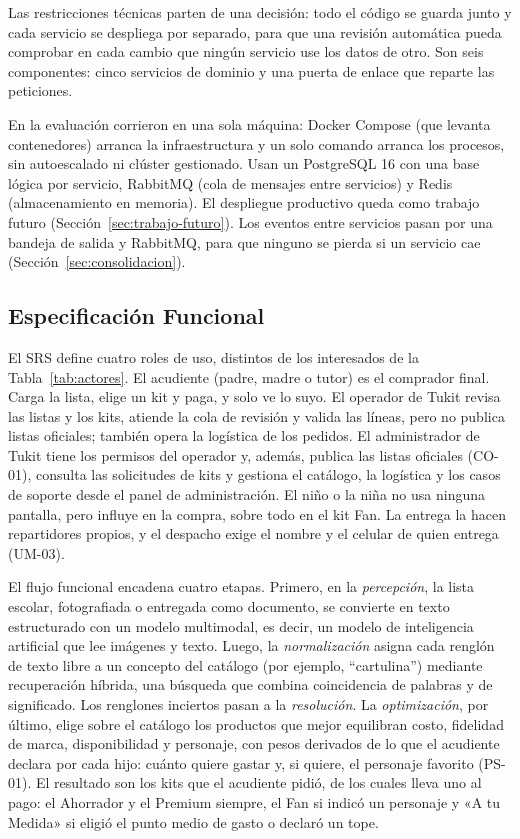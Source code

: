 Las restricciones técnicas parten de una decisión: todo el código se guarda junto y cada servicio se despliega por separado, para que una revisión automática pueda comprobar en cada cambio que ningún servicio use los datos de otro. Son seis componentes: cinco servicios de dominio y una puerta de enlace que reparte las peticiones.

En la evaluación corrieron en una sola máquina: Docker Compose (que levanta contenedores) arranca la infraestructura y un solo comando arranca los procesos, sin autoescalado ni clúster gestionado. Usan un PostgreSQL 16 con una base lógica por servicio, RabbitMQ (cola de mensajes entre servicios) y Redis (almacenamiento en memoria). El despliegue productivo queda como trabajo futuro (Sección~\ref{sec:trabajo-futuro}). Los eventos entre servicios pasan por una bandeja de salida y RabbitMQ, para que ninguno se pierda si un servicio cae (Sección~\ref{sec:consolidacion}).

\subsection{Especificación Funcional}
\label{sec:especificacion-funcional}

El SRS define cuatro roles de uso, distintos de los interesados de la Tabla~\ref{tab:actores}. El acudiente (padre, madre o tutor) es el comprador final.
Carga la lista, elige un kit y paga, y solo ve lo suyo. El operador de Tukit revisa las listas y los kits, atiende la
cola de revisión y valida las líneas, pero no publica listas oficiales; también opera la
logística de los pedidos. El administrador de
Tukit tiene los permisos del operador y, además, publica las listas oficiales (CO-01), consulta
las solicitudes de kits y gestiona el catálogo, la logística y los casos de soporte desde el
panel de administración. El niño o la niña no usa ninguna pantalla, pero influye en la compra,
sobre todo en el kit Fan. La entrega la hacen repartidores propios, y el despacho exige el nombre y
el celular de quien entrega (UM-03).

El flujo funcional encadena cuatro etapas. Primero, en la \emph{percepción}, la lista escolar, fotografiada o entregada como
documento, se convierte en texto estructurado con un modelo multimodal, es decir, un modelo de inteligencia artificial que lee imágenes y texto. Luego, la \emph{normalización} asigna cada renglón de
texto libre a un concepto del catálogo (por ejemplo, ``cartulina'') mediante recuperación híbrida, una búsqueda que combina coincidencia de palabras y de significado. Los renglones inciertos pasan a la \emph{resolución}. La
\emph{optimización}, por último, elige sobre el catálogo los productos que mejor equilibran
costo, fidelidad de marca, disponibilidad y personaje, con pesos derivados de lo que el
acudiente declara por cada hijo: cuánto quiere gastar y, si quiere, el personaje favorito
(PS-01). El resultado son los kits que el acudiente pidió, de los cuales lleva uno al pago:
el Ahorrador y el Premium siempre, el Fan si indicó un personaje y «A tu Medida» si eligió el
punto medio de gasto o declaró un tope.

